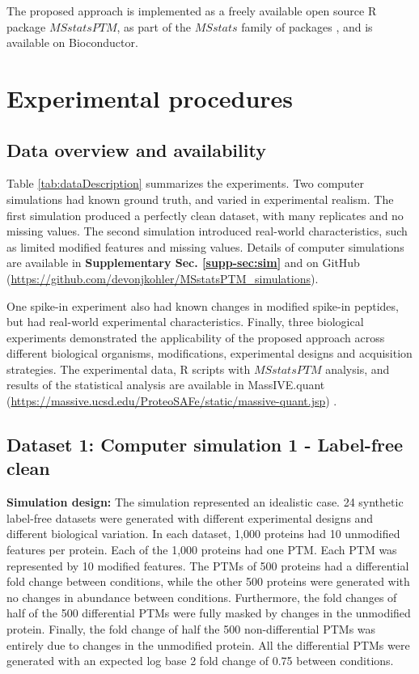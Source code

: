 \documentclass[mcp]{article}
\numberwithin{table}{section}
\begin{document}
The proposed approach is implemented as a freely available open source R package $MSstatsPTM$, as part of the $MSstats$ family of packages \cite{Choi:2014,Huang:2020}, and is available on Bioconductor.

\section{Experimental procedures}

\subsection*{Data overview and availability}

Table \ref{tab:dataDescription} summarizes the experiments. Two computer simulations had known ground truth, and varied in experimental realism. The first simulation produced a perfectly clean dataset, with many replicates and no missing values. The second simulation introduced real-world characteristics, such as limited modified features and missing values. Details of computer simulations are available in {\bf Supplementary Sec. \ref{supp-sec:sim}} and on GitHub (\url{https://github.com/devonjkohler/MSstatsPTM_simulations}).

One spike-in experiment also had known changes in modified spike-in peptides, but had real-world experimental characteristics. Finally, three biological experiments demonstrated the applicability of the proposed approach across different biological organisms, modifications, experimental designs and acquisition strategies. The experimental data, R scripts with $MSstatsPTM$ analysis, and results of the statistical analysis are available in MassIVE.quant (\url{https://massive.ucsd.edu/ProteoSAFe/static/massive-quant.jsp}) \cite{Choi:2020}. 

\subsection*{Dataset 1: Computer simulation 1 - Label-free clean}
\label{sec:comp_sim_procedure1}

{\bf Simulation design:} The simulation represented an idealistic case. 24 synthetic label-free datasets were generated with different experimental designs and different biological variation. In each dataset, 1,000 proteins had 10 unmodified features per protein. Each of the 1,000 proteins had one PTM. Each PTM was represented by 10 modified features. The PTMs of 500 proteins had a differential fold change between conditions, while the other 500 proteins were generated with no changes in abundance between conditions. Furthermore, the fold changes of half of the 500 differential PTMs were fully masked by changes in the unmodified protein. Finally, the fold change of half the 500 non-differential PTMs was entirely due to changes in the unmodified protein. All the differential PTMs were generated with an expected log base 2 fold change of 0.75 between conditions. 
\end{document}
